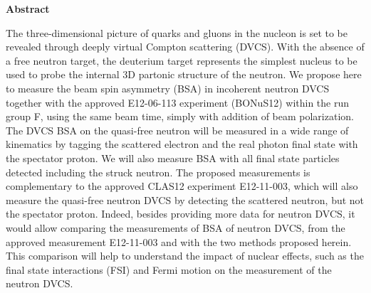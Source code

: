 \setcounter{page}{5}

     \begin{center}
{\large\textbf{Abstract}}
    \end{center}
\vspace*{0.4cm}

The three-dimensional picture of quarks and gluons in the nucleon is set to be 
revealed through deeply virtual Compton scattering (DVCS). With the absence of 
a free neutron target, the deuterium target represents the simplest nucleus to 
be used to probe the internal 3D partonic structure of the neutron.  We propose 
here to measure the beam spin asymmetry (BSA) in incoherent neutron DVCS 
together with the approved E12-06-113 experiment (BONuS12) within the run group 
F, using the same beam time, simply with addition of beam polarization.  The 
DVCS BSA on the quasi-free neutron will be measured in a wide range of 
kinematics by tagging the scattered electron and the real photon final state 
with the spectator proton. We will also measure BSA with all final state 
particles detected including the struck neutron. The proposed measurements is 
complementary to the approved CLAS12 experiment E12-11-003, which will also 
measure the quasi-free neutron DVCS by detecting the scattered neutron, but not 
the spectator proton.  Indeed, besides providing more data for neutron DVCS, it 
would allow comparing the measurements of BSA of neutron DVCS, from the 
approved measurement E12-11-003 and with the two methods proposed herein. This 
comparison will help to understand the impact of nuclear effects, such as the 
final state interactions (FSI) and Fermi motion on the measurement of the 
neutron DVCS.

\newpage

